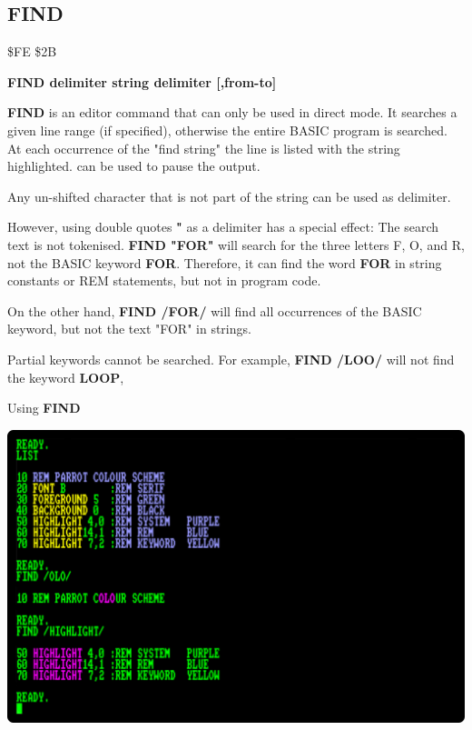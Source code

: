 \subsection{FIND}
\begin{description}[leftmargin=2cm,style=nextline]
\item [Token:] \$FE \$2B
\item [Format:] {\bf FIND {\bf delimiter} string {\bf delimiter} [,from-to]}
\item [Usage:]  {\bf FIND} is an editor command that can only be used
                in direct mode. It searches a given line range
                (if specified), otherwise the entire BASIC program is searched.
                At each occurrence of the "find string" the line is
                listed with the string highlighted.
                 can be used to pause the output.

\item [Remarks:] Any un-shifted character that is not part of
                 the string can be used as delimiter.

                 However, using double quotes {\bf "} as a delimiter has a special effect:
                 The search text is not tokenised.
                 {\bf FIND "FOR"} will search for the three letters F, O, and R, not
                 the BASIC keyword {\bf FOR}. Therefore, it can find the word
                 {\bf FOR} in string constants or REM statements, but not
                 in program code.

                 On the other hand, {\bf FIND /FOR/} will find all occurrences of
                 the BASIC keyword, but not the text "FOR" in strings.

                 Partial keywords cannot be searched. For example,
                 {\bf FIND /LOO/} will not find the keyword {\bf LOOP},


\item [Example:] Using {\bf FIND}
\item \begin{center}\includegraphics[width=0.8\linewidth]{images/find-example.png}\end{center}
\end{description}

